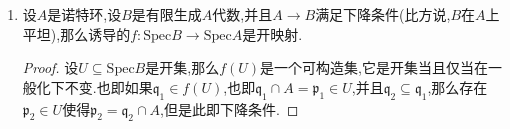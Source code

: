 \begin{enumerate}
\begin{proof}
    	\qquad
    	
    	按照一般自由性,存在$a\in A-\mathfrak{p}$,如果记$a$在$B'=B/\mathfrak{p}B$中的像是$a'$,那么$M_a/\mathfrak{p}M_a=(M/\mathfrak{p}M)_{a'}$在$A'_{a'}$上自由.于是如果$\mathfrak{Q}\not\in V(aB)$,就有$M_{\mathfrak{Q}}/\mathfrak{p}M_{\mathfrak{Q}}$在$A'_{a'}$上平坦,于是它也在$A'$上平坦.另一方面因为$A'$是有限$A$模,可以取它的有限自由预解来求$\mathrm{Tor}$,结合$M$是有限$B$模,就得到$\mathrm{Tor}_1^A(M,A')$是有限$B$模.因为它在$\mathfrak{P}$的局部化是零,所以存在$\mathfrak{P}$在$\mathrm{Spec}B$中的开邻域$W$,使得$\mathfrak{Q}\in W$总满足$\mathrm{Tor}_1^A(M,A')_{\mathfrak{Q}}=0$(我们之前证明过,对环$A$上的有限模$M$,用$U_r$表示使得$M_{\mathfrak{p}}$在$A_{\mathfrak{p}}$上被$r$个元生成的素理想$\mathfrak{p}$构成的集合,那么$U_r$总是开集,这里就是$U_0$是开集).于是$U$包含了$V(\mathfrak{P})$的开子集$W\cap V(\mathfrak{P})\cap V(aB)^c$.
    \end{proof}
    \item 设$A$是诺特环,设$B$是有限生成$A$代数,并且$A\to B$满足下降条件(比方说,$B$在$A$上平坦),那么诱导的$f:\mathrm{Spec}B\to\mathrm{Spec}A$是开映射.
    \begin{proof}
    	
    	设$U\subseteq\mathrm{Spec}B$是开集,那么$f(U)$是一个可构造集,它是开集当且仅当在一般化下不变.也即如果$\mathfrak{q}_1\in f(U)$,也即$\mathfrak{q}_1\cap A=\mathfrak{p}_1\in U$,并且$\mathfrak{q}_2\subseteq\mathfrak{q}_1$,那么存在$\mathfrak{p}_2\in U$使得$\mathfrak{p}_2=\mathfrak{q}_2\cap A$,但是此即下降条件.
    \end{proof}
\end{enumerate}

